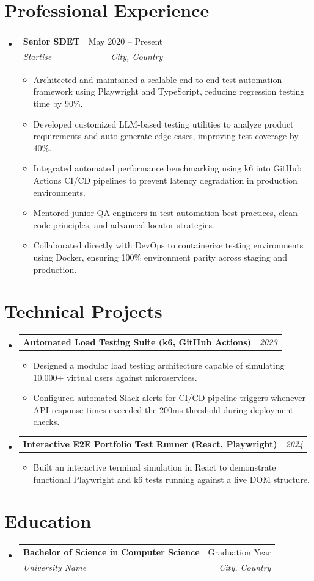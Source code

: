\documentclass[letterpaper,11pt]{article}
\makeatletter
\newcommand{\resumeSubheading}[4]{
  \vspace{4pt}\item
    \begin{tabular*}{0.97\textwidth}[t]{l@{\extracolsep{\fill}}r}
      \textbf{#1} & #2 \\
      \textit{#3} & \textit{#4} \\
    \end{tabular*}\vspace{-4pt}
}
\newcommand{\resumeProjectHeading}[2]{
  \vspace{4pt}\item
    \begin{tabular*}{0.97\textwidth}[t]{l@{\extracolsep{\fill}}r}
      \textbf{#1} & \textit{#2} \\
    \end{tabular*}\vspace{-4pt}
}
\newcommand{\resumeItemListStart}{\begin{itemize}[leftmargin=0.15in, label={-}, itemsep=3pt]}
\newcommand{\resumeItemListEnd}{\end{itemize}\vspace{4pt}}
\makeatother
\begin{document}
\section{Professional Experience}
\begin{itemize}[leftmargin=0in, label={}]

    \resumeSubheading
      {Senior SDET}{May 2020 -- Present}
      {Startise}{City, Country}
      \resumeItemListStart
        \item Architected and maintained a scalable end-to-end test automation framework using Playwright and TypeScript, reducing regression testing time by 90\%.
        \item Developed customized LLM-based testing utilities to analyze product requirements and auto-generate edge cases, improving test coverage by 40\%.
        \item Integrated automated performance benchmarking using k6 into GitHub Actions CI/CD pipelines to prevent latency degradation in production environments.
        \item Mentored junior QA engineers in test automation best practices, clean code principles, and advanced locator strategies.
        \item Collaborated directly with DevOps to containerize testing environments using Docker, ensuring 100\% environment parity across staging and production.
      \resumeItemListEnd


\end{itemize}

\section{Technical Projects}
\begin{itemize}[leftmargin=0in, label={}]

    \resumeProjectHeading
      {Automated Load Testing Suite (k6, GitHub Actions)}{2023}
      \resumeItemListStart
        \item Designed a modular load testing architecture capable of simulating 10,000+ virtual users against microservices.
        \item Configured automated Slack alerts for CI/CD pipeline triggers whenever API response times exceeded the 200ms threshold during deployment checks.
      \resumeItemListEnd

    \resumeProjectHeading
      {Interactive E2E Portfolio Test Runner (React, Playwright)}{2024}
      \resumeItemListStart
        \item Built an interactive terminal simulation in React to demonstrate functional Playwright and k6 tests running against a live DOM structure.
      \resumeItemListEnd

\end{itemize}

\section{Education}
\begin{itemize}[leftmargin=0in, label={}]
  \resumeSubheading
    {Bachelor of Science in Computer Science}{Graduation Year}
    {University Name}{City, Country}
\end{itemize}
\end{document}
